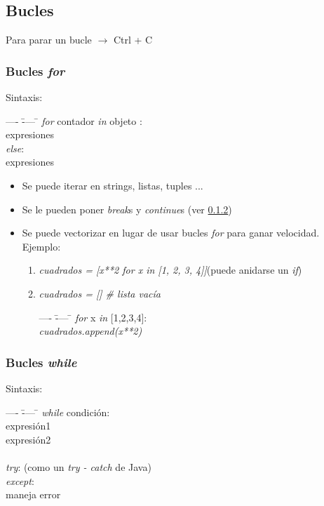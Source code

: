 	\subsection{Bucles}
		
	\noindent Para parar un bucle $\rightarrow$ Ctrl + C

		\subsubsection{Bucles \textit{for}}
		\noindent Sintaxis:
		\begin{tabbing}
		---- \= ---- \= \kill		
		\> \textit{for} contador \textit{in} objeto : \\
		\>\> expresiones \\
		\> \textit{else}: \\
		\>\> expresiones
		\end{tabbing}

		\begin{itemize}
		\item Se puede iterar en strings, listas, tuples ...
		\item Se le pueden poner \textit{break}s y \textit{continue}s (ver \ref{while})
		\item Se puede vectorizar en lugar de usar bucles \textit{for} para ganar velocidad. Ejemplo:
			\begin{enumerate}
			\item \textit{cuadrados = [x**2 for x in [1, 2, 3, 4]]}(puede anidarse un \textit{if})
			\item \textit{cuadrados = [] \# lista vacía}     
			\begin{tabbing} %
         	---- \= ---- \= \kill  %
			\textit{for} x \textit{in} [1,2,3,4]:\\
			\>\textit{cuadrados.append(x**2)}  %
			\end{tabbing}
			\end{enumerate}	
		\end{itemize}

		\subsubsection{Bucles \textit{while}}\label{while}
		\noindent Sintaxis:
		\begin{tabbing}
	    ---- \= ---- \= \kill
		\> \textit{while} condición:\\
		\>\> expresión1 \\
		\>\> expresión2 \\ \\
		\>\textit{try}: (como un \textit{try - catch} de Java)\\
		\>\textit{except}: \\
		\>\> maneja error 
		\end{tabbing}

